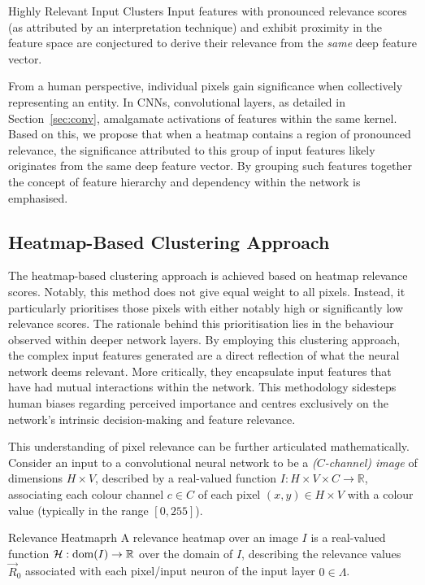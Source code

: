 \begin{Conjecture}{Highly Relevant Input Clusters}{}
Input features with pronounced relevance scores (as attributed by an interpretation technique) and exhibit proximity in the feature space are conjectured to derive their relevance from the \textit{same} deep feature vector. 
\end{Conjecture} 

From a human perspective, individual pixels gain significance when collectively representing an entity. In CNNs, convolutional layers, as detailed in Section~\ref{sec:conv}, amalgamate activations of features within the same kernel. Based on this, we propose that when a heatmap contains a region of pronounced relevance, the significance attributed to this group of input features likely originates from the same deep feature vector. By grouping such features together the concept of feature hierarchy and dependency within the network is emphasised.

\subsection{Heatmap-Based Clustering Approach}

The heatmap-based clustering approach is achieved based on heatmap relevance scores. Notably, this method does not give equal weight to all pixels. Instead, it particularly prioritises those pixels with either notably high or significantly low relevance scores. The rationale behind this prioritisation lies in the behaviour observed within deeper network layers. By employing this clustering approach, the complex input features generated are a direct reflection of what the neural network deems relevant. More critically, they encapsulate input features that have had mutual interactions within the network. This methodology sidesteps human biases regarding perceived importance and centres exclusively on the network's intrinsic decision-making and feature relevance.

This understanding of pixel relevance can be further articulated mathematically. Consider an input to a convolutional neural network to be a \emph{($C$-channel) image} of dimensions \( H \times V \), described by a real-valued function \( I: H \times V \times C \to \mathbb{R} \), associating each colour channel \( c \in C \) of each pixel \( (x, y) \in H \times V \) with a colour value (typically in the range \([0,255]\)).

\begin{Definition}{Relevance Heatmap}{rh}
A relevance heatmap over an image \( I \) is a real-valued function \( \mathcal{H}: \mathrm{dom}(I) \to \mathbb{R} \) over the domain of \( I \), describing the relevance values \( \vec{R}_0 \) associated with each pixel/input neuron of the input layer \( 0 \in \Lambda \).
\end{Definition}

